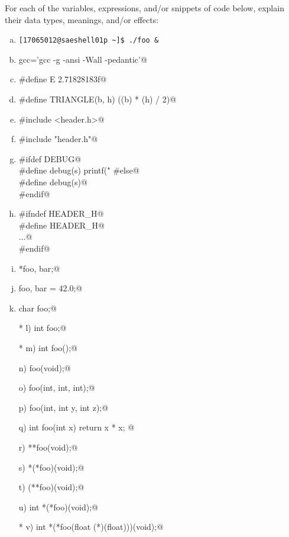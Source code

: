 \documentclass[a4paper,12pt]{article}
\begin{document}
For each of the variables, expressions, and/or snippets of code below,
explain their data types, meanings, and/or effects:

\begin{enumerate}[a)]
	\item \texttt{[17065012@saeshell01p \textasciitilde]\$ ./foo \&}
	\item \lstinline@alias gcc='gcc -g -ansi -Wall -pedantic'@
	\item \lstinline@#define E 2.71828183f@
	\item \lstinline@#define TRIANGLE(b, h) ((b) * (h) / 2)@
	\item \lstinline@#include <header.h>@
	\item \lstinline@#include "header.h"@
	\item \lstinline@#ifdef DEBUG@\\
	      \lstinline@        #define debug(s) printf("%s\n", s)@\\
	      \lstinline@#else@\\
	      \lstinline@        #define debug(s)@\\
	      \lstinline@#endif@
	\item \lstinline@#ifndef HEADER_H@\\
	      \lstinline@#define HEADER_H@\\
	      \lstinline@...@\\
	      \lstinline@#endif@
	\item \lstinline@int *foo, bar;@
	\item \lstinline@double foo, bar = 42.0;@
	\item \lstinline@unsigned char foo;@
	\item[* l)] \lstinline@extern int foo;@
	\item[* m)] \lstinline@extern int foo();@
	\item[n)] \lstinline@int foo(void);@
	\item[o)] \lstinline@int foo(int, int, int);@
	\item[p)] \lstinline@int foo(int, int y, int z);@
	\item[q)] \lstinline@static int foo(int x) { return x * x; }@
	\item[r)] \lstinline@int **foo(void);@
	\item[s)] \lstinline@int *(*foo)(void);@
	\item[t)] \lstinline@int (**foo)(void);@
	\item[u)] \lstinline@typedef int *(*foo)(void);@
	\item[* v)]
	      \lstinline@typedef int *(*foo(float (*)(float)))(void);@

\end{enumerate}
\end{document}

